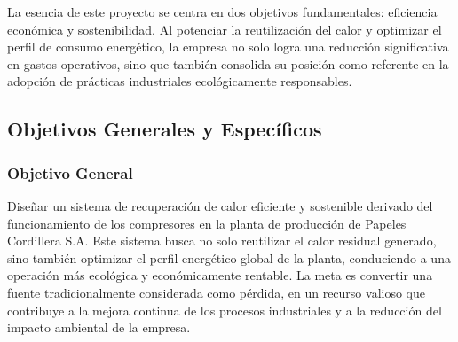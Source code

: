 \documentclass[11pt,a4paper]{article}  %
\begin{document}
La esencia de este proyecto se centra en dos objetivos fundamentales: eficiencia económica y sostenibilidad. Al potenciar la reutilización del calor y optimizar el perfil de consumo energético, la empresa no solo logra una reducción significativa en gastos operativos, sino que también consolida su posición como referente en la adopción de prácticas industriales ecológicamente responsables.

\subsection{Objetivos Generales y Específicos}

\subsubsection{Objetivo General}
Diseñar un sistema de recuperación de calor eficiente y sostenible derivado del funcionamiento de los compresores en la planta de producción de Papeles Cordillera S.A. Este sistema busca no solo reutilizar el calor residual generado, sino también optimizar el perfil energético global de la planta, conduciendo a una operación más ecológica y económicamente rentable. La meta es convertir una fuente tradicionalmente considerada como pérdida, en un recurso valioso que contribuye a la mejora continua de los procesos industriales y a la reducción del impacto ambiental de la empresa.
\end{document}
